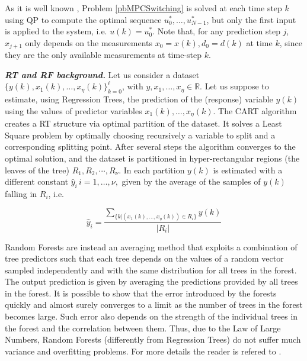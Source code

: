 \noindent As it is well known \cite{borrelli2017predictive}, Problem \ref{pbMPCSwitching} is solved at each time step $k$ using QP to compute the optimal sequence $u^*_0,\ldots,u^*_{N-1}$, but only the first input is applied to the system, i.e. $u(k) = u^*_0$. Note that, for any prediction step $j$, $x_{j+1}$ only depends on the measurements $x_0=x(k),d_0=d(k)$ at time $k$, since they are the only available measurements at time-step $k$. 


\textbf{\emph{RT and RF background.}} Let us consider a dataset $\{y(k),x_1(k),\ldots,x_\eta(k)\}_{k=0}^\ell$, with $y,x_1,\ldots,x_\eta\in\mathbb{R}$. Let us suppose  to estimate, using Regression Trees, the prediction of the (response) variable $y(k)$ using the values of predictor variables $x_1(k),\ldots,x_\eta(k)$. The CART algorithm \cite{BreimanCART2017} creates a RT structure via optimal partition of the dataset. It solves a Least Square problem by optimally choosing recursively a variable to split and a corresponding splitting point. After several steps the algorithm converges to the optimal solution, and the dataset is partitioned in hyper-rectangular regions (the leaves of the tree) $R_1, R_2,\cdots, R_\nu$. In each partition $y(k)$ is estimated with a different constant $\hat y_i\, i=1,\ldots,\nu,$ given by the average of the samples of $y(k)$ falling in $R_i$, i.e.

\begin{equation}\label{eqAverageResponseRT}
\hat y_{i} = \frac{\sum\limits_{\{k|(x_1(k),\ldots, x_\eta(k)) \in R_i\}}y(k)}{|R_i|}
\end{equation}


\noindent Random Forests \cite{BreimanML2001} are instead an averaging method that exploits a combination of tree predictors such that each tree depends on the values of a random vector sampled independently and with the same distribution for all trees in the forest. The output prediction is given by averaging the predictions provided by all trees in the forest. It is possible to show that the error introduced by the forests quickly and almost surely converges to a limit as the number of trees in the forest becomes large. Such error also depends on the strength of the individual trees in the forest and the correlation between them. Thus, due to the Law of Large Numbers, Random Forests (differently from Regression Trees) do not suffer much variance and overfitting problems. For more details the reader is refered to \cite{BreimanCART2017,BreimanML2001}.

